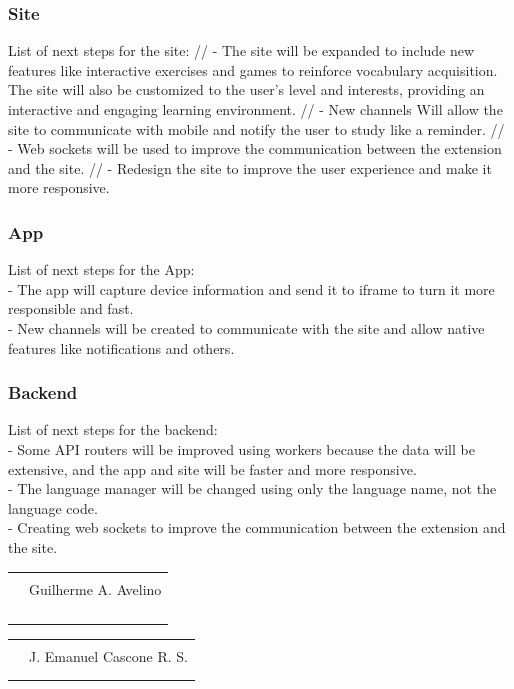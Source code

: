 \documentclass[12pt]{article}
\begin{document}
\subsubsection{Site}

List of next steps for the site: //
- The site will be expanded to include new features like interactive exercises and games to reinforce vocabulary acquisition. The site will also be customized to the user's level and interests, providing an interactive and engaging learning environment.  //
- New channels Will allow the site to communicate with mobile and notify the user to study like a reminder. //
- Web sockets will be used to improve the communication between the extension and the site. //
- Redesign the site to improve the user experience and make it more responsive.

\subsubsection{App}

List of next steps for the App: \\
- The app will capture device information and send it to iframe to turn it more responsible and fast.  \\
- New channels will be created to communicate with the site and allow native features like notifications and others.

\subsubsection{Backend} 

List of next steps for the backend: \\
- Some API routers will be improved using workers because the data will be extensive, and the app and site will be faster and more responsive. \\
- The language manager will be changed using only the language name, not the language code.  \\
- Creating web sockets to improve the communication between the extension and the site.





\centering
\break

\begin{tabular}{@{}p{.5in}p{4in}@{}}
& \hrulefill \\
& \centerline{Guilherme A. Avelino} \\
\\ \\ \\ \\ 
\end{tabular}

\centering
\begin{tabular}{@{}p{.5in}p{4in}@{}}
& \hrulefill \\
& \centerline{J. Emanuel Cascone R. S.} \\
\\ \\
\end{tabular}
\end{document}
